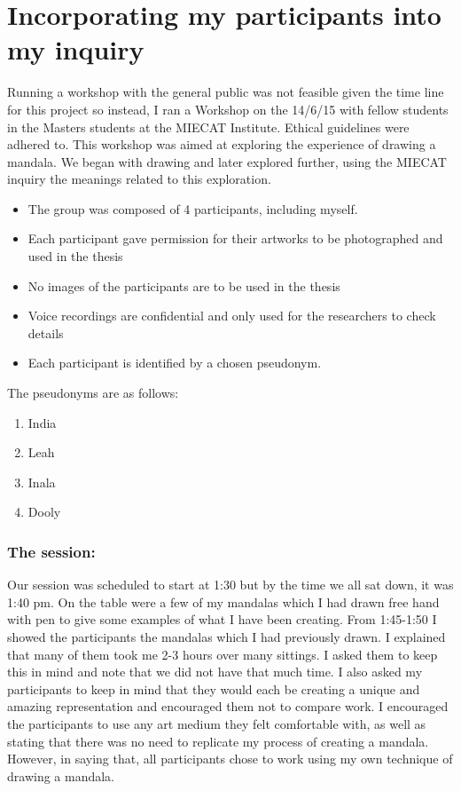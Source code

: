 \chapter{Incorporating my participants into my inquiry}



Running a workshop with the general public was not feasible given the time line for this project so instead, I ran a Workshop on the 14/6/15 with fellow students in the Masters students at the MIECAT Institute. Ethical guidelines were adhered to. This workshop was aimed at exploring the experience of drawing a mandala. We began with drawing and later explored further, using the MIECAT inquiry the meanings related to this exploration. 

\begin{itemize}
\item 
The group was composed of 4 participants, including myself.
\item Each participant gave permission for their artworks to be photographed and used in the thesis 
\item No images of the participants are to be used in the thesis
\item Voice recordings are confidential and only used for the researchers to check details 
\item Each participant is identified by a chosen pseudonym. 
\end{itemize}

The pseudonyms are as follows:

\begin{enumerate}
\item India
\item Leah
\item Inala
\item Dooly
\end{enumerate}

\subsection{The session:}

Our session was scheduled to start at 1:30 but by the time we all sat down, it was 1:40 pm. On the table were a few of my mandalas which I had drawn free hand with pen to give some examples of what I have been creating. From 1:45-1:50 I showed the participants the mandalas which I had previously drawn. I explained that many of them took me 2-3 hours over many sittings. I asked them to keep this in mind and note that we did not have that much time. I also asked my participants to keep in mind that they would each be creating a unique and amazing representation and encouraged them not to compare work. I encouraged the participants to use any art medium they felt comfortable with, as well as stating that there was no need to replicate my process of creating a mandala. However, in saying that, all participants chose to work using my own technique of drawing a mandala.

